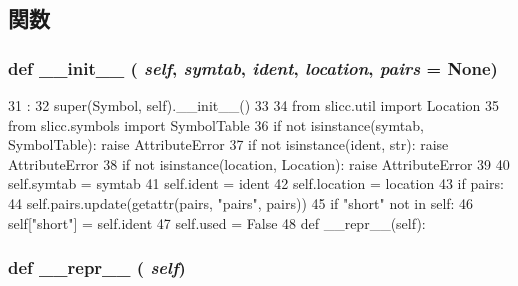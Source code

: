 \subsection{関数}
\hypertarget{classslicc_1_1symbols_1_1Symbol_1_1Symbol_ac775ee34451fdfa742b318538164070e}{
\subsubsection[{\_\-\_\-init\_\-\_\-}]{\setlength{\rightskip}{0pt plus 5cm}def \_\-\_\-init\_\-\_\- ( {\em self}, \/   {\em symtab}, \/   {\em ident}, \/   {\em location}, \/   {\em pairs} = {\ttfamily None})}}
\label{classslicc_1_1symbols_1_1Symbol_1_1Symbol_ac775ee34451fdfa742b318538164070e}



\begin{DoxyCode}
31                                                            :
32         super(Symbol, self).__init__()
33 
34         from slicc.util import Location
35         from slicc.symbols import SymbolTable
36         if not isinstance(symtab, SymbolTable): raise AttributeError
37         if not isinstance(ident, str): raise AttributeError
38         if not isinstance(location, Location): raise AttributeError
39 
40         self.symtab = symtab
41         self.ident = ident
42         self.location = location
43         if pairs:
44             self.pairs.update(getattr(pairs, "pairs", pairs))
45         if "short" not in self:
46             self["short"] = self.ident
47         self.used = False
48 
    def __repr__(self):
\end{DoxyCode}
\hypertarget{classslicc_1_1symbols_1_1Symbol_1_1Symbol_ad8b9328939df072e4740cd9a63189744}{
\subsubsection[{\_\-\_\-repr\_\-\_\-}]{\setlength{\rightskip}{0pt plus 5cm}def \_\-\_\-repr\_\-\_\- ( {\em self})}}
\label{classslicc_1_1symbols_1_1Symbol_1_1Symbol_ad8b9328939df072e4740cd9a63189744}


